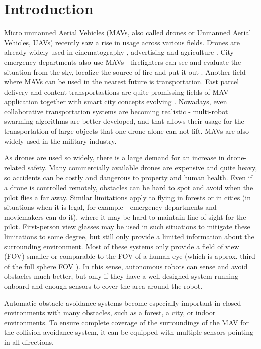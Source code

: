 \chapter{Introduction}

\label{chapter:intro}

Micro unmanned Aerial Vehicles (MAVs, also called drones or Unmanned Aerial Vehicles, UAVs) recently saw a rise in usage across various fields. 
Drones are already widely used in cinematography \cite{Mademlis2020}, advertising \cite{Ullah2021} and agriculture \cite{Kim2019}. 
City emergency departments also use MAVs - firefighters can see and evaluate the situation from the sky, localize the source of fire and put it out \cite{Pritzl2021}.
Another field where MAVs can be used in the nearest future is transportation. 
Fast parcel delivery \cite{She2021} and content transportastions \cite{Gupta2021,Aloqaily2022} are quite promissing fields of MAV application together with smart city concepts evolving \cite{Ortiz2019}.
Nowadays, even collaborative transportation systems are becoming realistic - multi-robot swarming algorithms are better developed, and that allows their usage for the transportation of large objects \cite{Bacelar2020} that one drone alone can not lift. 
MAVs are also widely used in the military industry.

As drones are used so widely, there is a large demand for an increase in drone-related safety. 
Many commercially available drones are expensive and quite heavy, so accidents can be costly and dangerous to property and human health. 
Even if a drone is controlled remotely, obstacles can be hard to spot and avoid when the pilot flies a far away.
Similar limitations apply to flying in forests or in cities (in situations when it is legal, for example - emergency departments and moviemakers can do it), where it may be hard to maintain line of sight for the pilot.
First-person view glasses may be used in such situations to mitigate these limitations to some degree, but still only provide a limited information about the surrounding environment.
Most of these systems only provide a field of view (FOV) smaller or comparable to the FOV of a human eye (which is approx. third of the full sphere FOV \cite{humeye}).
In this sense, autonomous robots can sense and avoid obstacles much better, but only if they have a well-designed system running onboard and enough sensors to cover the area around the robot.

Automatic obstacle avoidance systems become especially important in closed environments with many obstacles, such as a forest, a city, or indoor environments.
To ensure complete coverage of the surroundings of the MAV for the collision avoidance system, it can be equipped with multiple sensors pointing in all directions.

